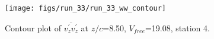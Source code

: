 \begin{figure}[H]
\centering
\texttt{[image: figs/run\_33/run\_33\_ww\_contour]}
\caption{Contour plot of $\overline{v_{z}^{\prime} v_{z}^{\prime}}$ at $z/c$=8.50, $V_{free}$=19.08, station 4.}
\label{fig:run_33_ww_contour}
\end{figure}


